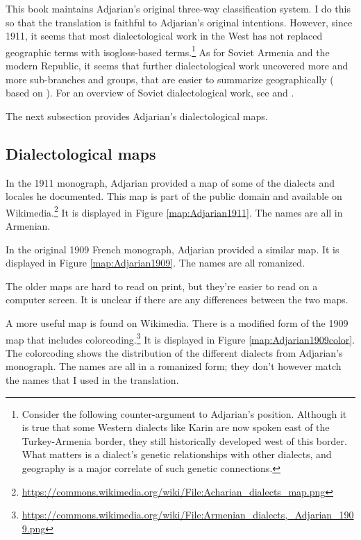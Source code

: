 This book maintains Adjarian's original three-way classification system. I do this so that the translation is faithful to Adjarian's original intentions. However, since 1911, it seems that most dialectological work in the West has not replaced geographic terms with isogloss-based terms.\footnote{Consider the following counter-argument to Adjarian's position.  Although it is true that some Western dialects like Karin are now spoken east of the Turkey-Armenia border, they still historically developed west of this border. What matters is a dialect's genetic relationships with other dialects, and geography is a major correlate of such genetic connections.} As for Soviet Armenia and the modern Republic, it seems that further dialectological work uncovered more and more sub-branches and groups, that are easier to summarize geographically (\citealt[\S 4]{Martirosyan-2019-Armeniandialects} based on \citealt{Jahukyan-1972-ArmenianDiaolectology}). For an overview of Soviet dialectological work, see \citet{Djahukian-1986-IntroductionToDialectology} and \citet{Weitenberg-2017-DialectologyArmenian}.


The next subsection provides Adjarian's dialectological maps.

\subsection{Dialectological maps}\label{section:HossepIntro:maps}


In the 1911 monograph, Adjarian provided a map of some of the dialects and locales he documented. This map is part of the public domain and available on Wikimedia.\footnote{\url{https://commons.wikimedia.org/wiki/File:Acharian_dialects_map.png}} It is displayed in Figure \ref{map:Adjarian1911}. The names are all in Armenian. 

In the original 1909 French monograph, Adjarian provided a similar map. It   is displayed in Figure \ref{map:Adjarian1909}. The names are all romanized. 


The older maps are hard to read on print, but they're easier to read on a computer screen. It is unclear if there are any differences between the two maps.

A more useful map is found on Wikimedia. There is a modified form of the 1909 map that includes colorcoding.\footnote{\url{https://commons.wikimedia.org/wiki/File:Armenian_dialects,_Adjarian_1909.png}} It   is displayed in Figure \ref{map:Adjarian1909color}. The colorcoding shows the distribution of the different dialects from Adjarian's monograph. The names are all in a romanized form; they don't however match the names that I used in the translation. 



